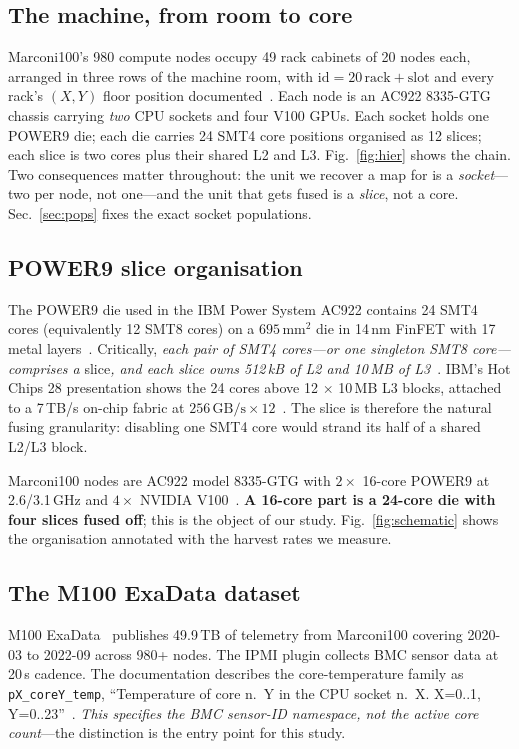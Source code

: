\documentclass[10pt,conference]{IEEEtran}
\begin{document}
\subsection{The machine, from room to core}
Marconi100's 980 compute nodes occupy 49 rack cabinets of 20 nodes each, arranged in three rows of
the machine room, with $\mathrm{id}=20\,\mathrm{rack}+\mathrm{slot}$ and every rack's $(X,Y)$
floor position documented~\cite{exadata_repo}. Each node is an AC922 8335-GTG chassis carrying
\emph{two} CPU sockets and four V100 GPUs. Each socket holds one POWER9 die; each die carries 24
SMT4 core positions organised as 12 slices; each slice is two cores plus their shared L2 and L3.
Fig.~\ref{fig:hier} shows the chain. Two consequences matter throughout: the unit we recover a map
for is a \emph{socket}---two per node, not one---and the unit that gets fused is a \emph{slice},
not a core. Sec.~\ref{sec:pops} fixes the exact socket populations.

\subsection{POWER9 slice organisation}
The POWER9 die used in the IBM Power System AC922 contains 24 SMT4 cores (equivalently 12 SMT8
cores) on a $695\,\mathrm{mm}^2$ die in 14\,nm FinFET with 17 metal layers~\cite{wikichip_power9}.
Critically, \emph{each pair of SMT4 cores---or one singleton SMT8 core---comprises a}
slice\emph{, and each slice owns 512\,kB of L2 and 10\,MB of
L3}~\cite{wikichip_power9,thompto2016power9}. IBM's Hot Chips 28 presentation shows the 24 cores
above 12 $\times$ 10\,MB L3 blocks, attached to a 7\,TB/s on-chip fabric at
$256\,\mathrm{GB/s}\times12$~\cite{thompto2016power9}. The slice is therefore the natural fusing
granularity: disabling one SMT4 core would strand its half of a shared L2/L3 block.

Marconi100 nodes are AC922 model 8335-GTG with $2\times$ 16-core POWER9 at 2.6/3.1\,GHz and
$4\times$ NVIDIA V100~\cite{ibm_ac922,cineca_m100}. \textbf{A 16-core part is a 24-core die with
four slices fused off}; this is the object of our study. Fig.~\ref{fig:schematic} shows the
organisation annotated with the harvest rates we measure.

\subsection{The M100 ExaData dataset}
M100 ExaData~\cite{borghesi2023m100} publishes 49.9\,TB of telemetry from Marconi100 covering
2020-03 to 2022-09 across 980+ nodes. The IPMI plugin collects BMC sensor data at 20\,s cadence.
The documentation describes the core-temperature family as \texttt{pX\_coreY\_temp}, ``Temperature
of core n.\ Y in the CPU socket n.\ X. X=0..1, Y=0..23''~\cite{exadata_repo}. \emph{This specifies
the BMC sensor-ID namespace, not the active core count}---the distinction is the entry point for
this study.
\end{document}
